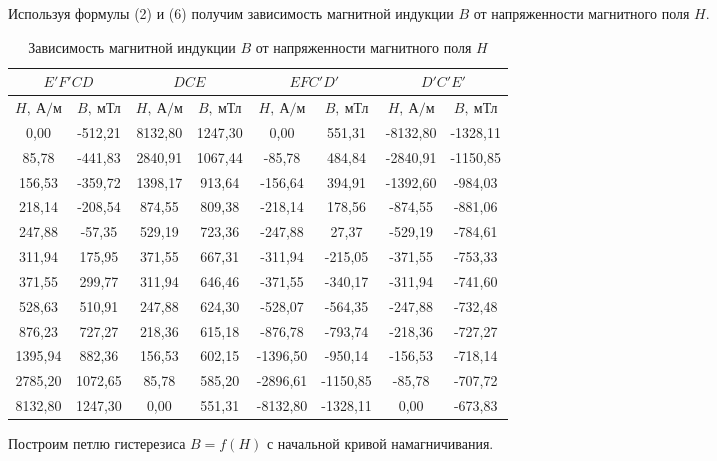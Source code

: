 Используя формулы (2) и (6) получим
зависимость магнитной индукции $B$ от
напряженности магнитного поля $H$.
\renewcommand{\arraystretch}{1.05} 
\begin{table}[H]
\centering
\begin{tabular}{|c|c|c|c|c|c|c|c|}
\hline
\multicolumn{2}{|c|}{$E'F'CD$} &
\multicolumn{2}{c|}{$DCE$} &
\multicolumn{2}{c|}{$EFC'D'$}   &
\multicolumn{2}{c|}{$D'C'E'$} \\ \hline
 $H, \
\text{А/м}$        & $B, \ \text
{мТл}$  &   $H, \
\text{А/м}$
& $B, \ \text
{мТл}$            & $H, \
\text{А/м}$
& $B, \ \text
{мТл}$         & $H, \
\text{А/м}$
& $B, \ \text
{мТл}$        \\ \hline
0,00    & -512,21 & 8132,80 & 1247,30 & 0,00     & 551,31   & -8132,80 & -1328,11 \\ \hline
85,78   & -441,83 & 2840,91 & 1067,44 & -85,78   & 484,84   & -2840,91 & -1150,85 \\ \hline
156,53  & -359,72 & 1398,17 & 913,64  & -156,64  & 394,91   & -1392,60 & -984,03  \\ \hline
218,14  & -208,54 & 874,55  & 809,38  & -218,14  & 178,56   & -874,55  & -881,06  \\ \hline
247,88  & -57,35  & 529,19  & 723,36  & -247,88  & 27,37    & -529,19  & -784,61  \\ \hline
311,94  & 175,95  & 371,55  & 667,31  & -311,94  & -215,05  & -371,55  & -753,33  \\ \hline
371,55  & 299,77  & 311,94  & 646,46  & -371,55  & -340,17  & -311,94  & -741,60  \\ \hline
528,63  & 510,91  & 247,88  & 624,30  & -528,07  & -564,35  & -247,88  & -732,48  \\ \hline
876,23  & 727,27  & 218,36  & 615,18  & -876,78  & -793,74  & -218,36  & -727,27  \\ \hline
1395,94 & 882,36  & 156,53  & 602,15  & -1396,50 & -950,14  & -156,53  & -718,14  \\ \hline
2785,20 & 1072,65 & 85,78   & 585,20  & -2896,61 & -1150,85 & -85,78   & -707,72  \\ \hline
8132,80 & 1247,30 & 0,00    & 551,31  & -8132,80 & -1328,11 & 0,00     & -673,83  \\ \hline\end{tabular}
\captionsetup{justification=centering}
\caption{Зависимость магнитной индукции
$B$ от напряженности магнитного поля $H$}
\end{table}

Построим петлю гистерезиса $B = f(H)$ с
начальной кривой намагничивания.

